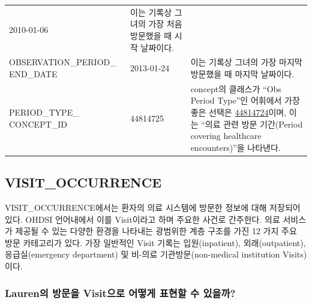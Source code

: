 \documentclass[11pt]{book}
\theoremstyle{definition}
\theoremstyle{definition}
\theoremstyle{definition}
\theoremstyle{remark}
\begin{document}
\begin{longtable}[]{@{}lll@{}}
\begin{minipage}[t]{0.14\columnwidth}
2010-01-06\strut
\end{minipage} & \begin{minipage}[t]{0.48\columnwidth}\raggedright\strut
이는 기록상 그녀의 가장 처음 방문했을 때 시작 날짜이다.\strut
\end{minipage}\tabularnewline
\begin{minipage}[t]{0.29\columnwidth}\raggedright\strut
OBSERVATION\_PERIOD\_ END\_DATE\strut
\end{minipage} & \begin{minipage}[t]{0.14\columnwidth}\raggedright\strut
2013-01-24\strut
\end{minipage} & \begin{minipage}[t]{0.48\columnwidth}\raggedright\strut
이는 기록상 그녀의 가장 마지막 방문했을 때 마지막 날짜이다.\strut
\end{minipage}\tabularnewline
\begin{minipage}[t]{0.29\columnwidth}\raggedright\strut
PERIOD\_TYPE\_ CONCEPT\_ID\strut
\end{minipage} & \begin{minipage}[t]{0.14\columnwidth}\raggedright\strut
44814725\strut
\end{minipage} & \begin{minipage}[t]{0.48\columnwidth}\raggedright\strut
concept의 클래스가 ``Obs Period Type''인 어휘에서 가장 좋은 선택은
\href{http://athena.ohdsi.org/search-terms/terms/44814724}{44814724}이며,
이는 ``의료 관련 방문 기간(Period covering healthcare encounters)''을
나타낸다.\strut
\end{minipage}\tabularnewline
\bottomrule
\end{longtable}

\subsection{VISIT\_OCCURRENCE}\label{visitOccurrence}

VISIT\_OCCURRENCE에서는 환자의 의료 시스템에 방문한 정보에 대해 저장되어
있다. OHDSI 언어내에서 이를 Visit이라고 하며 주요한 사건로 간주한다.
의료 서비스가 제공될 수 있는 다양한 환경을 나타내는 광범위한 계층 구조를
가진 12 가지 주요 방문 카테고리가 있다. 가장 일반적인 Visit 기록는
입원(inpatient), 외래(outpatient), 응급실(emergency department) 및
비-의료 기관방문(non-medical institution Visits)이다.

\subsubsection*{Lauren의 방문을 Visit으로 어떻게 표현할 수
있을까?}\label{lauren--visit----}
\end{document}
